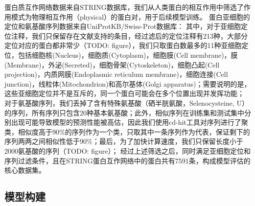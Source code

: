\documentclass[a4paper,UTF8]{article}
\begin{document}
蛋白质互作网络数据来自STRING数据库，我们从人类蛋白的相互作用中筛选了作用模式为物理相互作用（physical）的蛋白对，用于后续模型训练。
蛋白亚细胞的定位和氨基酸序列数据来自UniProtKB/Swiss-Prot数据库：
其中，对于亚细胞定位注释，我们只保留存在文献支持的条目，经过滤后的定位注释有213种，大部分定位对应的蛋白都非常少（TODO: figure），我们只取蛋白数最多的11种亚细胞定位，包括细胞核(Nucleus)，细胞质(Cytoplasm)，细胞膜(Cell membrane)，膜(Membrane)，外泌(Secreted)，细胞骨架(Cytoskeleton)，细胞凸起(Cell projection)，内质网膜(Endoplasmic reticulum membrane)，细胞连接(Cell junction)，线粒体(Mitochondrion)和高尔基体(Golgi apparatus)；需要说明的是，这些亚细胞定位并不是互斥的，同一个蛋白可能会在多个位置出现并发挥功能；
对于氨基酸序列，我们丢掉了含有特殊氨基酸（硒半胱氨酸，Selenocysteine, U）的序列，所有序列只包含20种基本氨基酸；此外，相似序列在训练集和测试集中分别出现可能导致模型的预测性能被高估，因此我们使用cd-hit工具对序列进行了聚类，相似度高于90\%的序列作为一个类，只取其中一条序列作为代表，保证剩下的序列两两之间相似性低于90\%；最后，为了加快计算速度，我们只保留长度小于2000氨基酸的序列（TODO: figure）；
经过上述筛选之后，同时满足亚细胞定位和序列过滤条件，且在STRING蛋白互作网络中的蛋白共有7591条，构成模型评估的核心数据集。

\subsection{模型构建}
\end{document}
